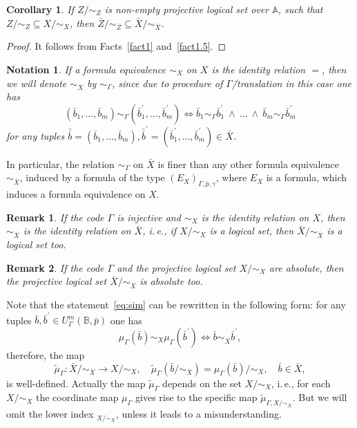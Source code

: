 \documentclass[12pt]{article}
\newtheorem{corollary}{Corollary}
\newtheorem{remark}{Remark}
\newtheorem{notation}{Notation}
\theoremstyle{definition}
\def\MA{{\mathbb{A}}}
\def\MB{{\mathbb{B}}}
\begin{document}
\begin{corollary}\label{cor:subset}
    If $Z/{\sim_Z}$ is non-empty projective logical set over $\MA$, such that $Z/{\sim_Z}\subseteq X/{\sim_X}$, then $\bar Z/{\sim_{\bar Z}}\subseteq \bar X/{\sim_{\bar X}}$.
\end{corollary}

\begin{proof}
    It follows from Facts~\ref{fact1} and~\ref{fact1.5}.
\end{proof}

\begin{notation}
If a formula equivalence $\sim_X$ on $X$ is the identity relation $=$, then we will denote $\sim_{\bar X}$ by $\sim_\Gamma$, since due to procedure of $\Gamma$\=/translation in this case one has
\begin{equation}\label{eq:rel_Gamma}
(\bar b_1,\ldots,\bar b_m)\sim_\Gamma (\bar b_1^\prime,\ldots, \bar b^\prime_m) \iff \bar b_1\sim_\Gamma \bar b_1^\prime\:\wedge\:\ldots\:\wedge\: \bar b_m\sim_\Gamma \bar b_m^\prime
\end{equation}
for any tuples $\bar{\bar b}=(\bar b_1,\ldots,\bar b_m),\bar{\bar b}^\prime=(\bar b_1^\prime,\ldots,\bar b_m^\prime)\in \bar X$. 
\end{notation}

In particular, the relation $\sim_\Gamma$ on $\bar X$ is finer than any other formula equivalence $\sim_{\bar X}$, induced by a formula of the type $(E_X)_{\Gamma, \bar p, \gamma}$, where $E_X$ is a formula, which induces a formula equivalence on $X$.

\begin{remark}
If the code $\Gamma$ is injective and $\sim_X$ is the identity relation on $X$, then $\sim_{\bar X}$ is the identity relation on $\bar X$, i.\,e., if $X/{\sim_X}$ is a logical set, then $\bar X/{\sim_{\bar X}}$ is a logical set too.
\end{remark}

\begin{remark}
If the code $\Gamma$ and the projective logical set $X/{\sim_X}$ are absolute, then the projective logical set $\bar X/{\sim_{\bar X}}$ is absolute too.
\end{remark}

Note that the statement~\eqref{eq:sim} can be rewritten in the following form: for any tuples
$\bar b, \bar b^\prime\in U^m_\Gamma(\MB,\bar p)$ one has 
$$
\mu_\Gamma(\bar b)\sim_X \mu_\Gamma (\bar b^\prime)\iff \bar b \sim_{\bar X} \bar b^\prime,
$$
therefore, the map 
$$
\tilde\mu_\Gamma\colon \bar X/{\sim_{\bar X}} \to X/{\sim_X}, \quad \tilde\mu_\Gamma(\bar b/{\sim_{\bar X}})=\mu_\Gamma(\bar b)/{\sim_X},\quad \bar b\in \bar X,
$$
is well-defined. Actually the map $\tilde\mu_\Gamma$ depends on the set $X/{\sim_X}$, i.\,e., for each $X/{\sim_X}$ the coordinate map $\mu_\Gamma$ gives rise to the specific map $\tilde\mu_{\Gamma,X/{\sim_X}}$. But we will omit the lower index $_{X/\sim_X}$, unless it leads to a misunderstanding.
\end{document}
